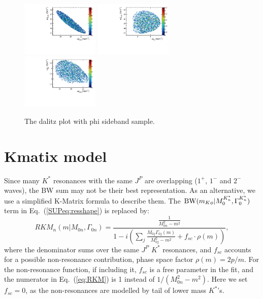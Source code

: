 \begin{figure}[!hbtp]
\centering
\includegraphics[width=0.33\textwidth]{Figures/03_Zcs/app_non_phi/phi_sideband_mjpsik2_mjpsiphi2.pdf}%
\includegraphics[width=0.33\textwidth]{Figures/03_Zcs/app_non_phi/phi_sideband_mjpsik2_mphik2.pdf}
\includegraphics[width=0.33\textwidth]{Figures/03_Zcs/app_non_phi/phi_sideband_mphik2_mjpsiphi2.pdf}%
\caption{The dalitz plot with phi sideband sample.}
\label{fig:dalitz_plot_phi_sideband}
\end{figure}



\section{Kmatix model}
\label{SUPPsec:kmatrix}
Since many $K^*$ resonances with the same $J^P$ are overlapping ($1^+$, $1^-$ and $2^-$ waves), 
the BW sum may not be their best representation. As an alternative, 
we use a simplified K-Matrix formula to describe them. 
The ${\rm BW}(m_{K\phi} | M_{0}^{K^*_n}, \Gamma_{0}^{K^*_n} )$ term in Eq.~(\ref{SUPeq:resshape}) is replaced by: 
\begin{equation}
RKM_{n}(m | M_{0n}, \Gamma_{0n} ) = \frac{\frac{1}{M_{0n}^2-m^2}}{1-i(\sum_j\frac{M_{0j}\Gamma_{0j}(m)}{M_{0j}^2-m^2}+f_{sc}\cdot\rho(m))},
\label{eq:RKM}
\end{equation}
where the denominator sums over the same $J^P$ $K^*$ resonances, and $f_{sc}$ accounts for a possible non-resonance contribution, 
phase space factor $\rho(m)=2p/m$. 
For the non-resonance function, 
if including it, 
$f_{sc}$ is a free parameter in the fit, 
and the numerator in Eq.~(\ref{eq:RKM}) is 1 instead of $1/(M_{0n}^2-m^2)$. 
Here we set $f_{sc}=0$, 
as the non-resonances are modelled by tail of lower mass $K^*$'s.

